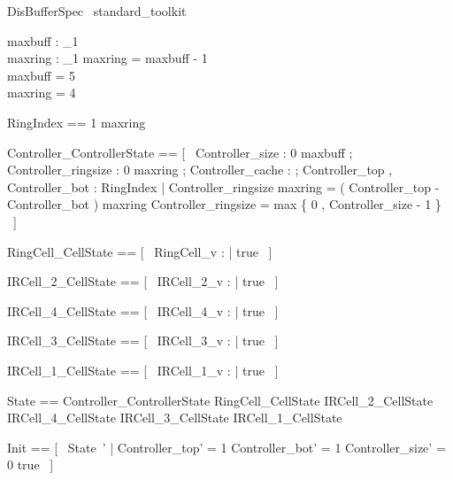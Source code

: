 \documentclass{article}
\begin{document}
\begin{zsection}
    \SECTION DisBufferSpec \parents~standard\_toolkit
\end{zsection}

\begin{axdef}
	maxbuff : \nat_1 \\
 maxring : \nat_1 
\where
 maxring = maxbuff - 1 \\
 maxbuff = 5 \\
 maxring = 4
\end{axdef}

\begin{zed}
	RingIndex == 1 \upto maxring
\end{zed}

\begin{zed}
	Controller\_ControllerState == [~  Controller\_size : 0 \upto maxbuff ; Controller\_ringsize : 0 \upto maxring ; Controller\_cache : \nat ; Controller\_top , Controller\_bot : RingIndex | Controller\_ringsize \mod maxring = ( Controller\_top - Controller\_bot ) \mod maxring \land Controller\_ringsize = max \{ 0 , Controller\_size - 1 \}  ~]
\end{zed}

\begin{zed}
	RingCell\_CellState == [~  RingCell\_v : \nat | true  ~]
\end{zed}

\begin{zed}
	IRCell\_2\_CellState == [~  IRCell\_2\_v : \nat | true  ~]
\end{zed}

\begin{zed}
	IRCell\_4\_CellState == [~  IRCell\_4\_v : \nat | true  ~]
\end{zed}

\begin{zed}
	IRCell\_3\_CellState == [~  IRCell\_3\_v : \nat | true  ~]
\end{zed}

\begin{zed}
	IRCell\_1\_CellState == [~  IRCell\_1\_v : \nat | true  ~]
\end{zed}

\begin{zed}
	State == Controller\_ControllerState \land RingCell\_CellState \land IRCell\_2\_CellState \land IRCell\_4\_CellState \land IRCell\_3\_CellState \land IRCell\_1\_CellState
\end{zed}

\begin{zed}
	Init == [~  State~' | Controller\_top' = 1 \land Controller\_bot' = 1 \land Controller\_size' = 0 \land true  ~]
\end{zed}
\end{document}
